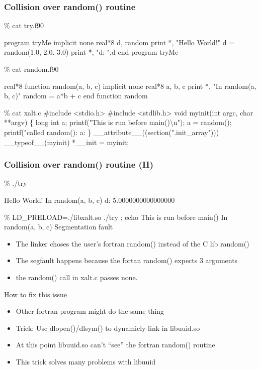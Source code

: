 \documentclass{beamer}
\begin{document}
\begin{frame}[fragile]
    \frametitle{Collision over random() routine}
 {\tiny
    \begin{semiverbatim}
\% cat try.f90

program tryMe
   implicit none 
   real*8 d, random
   print *, "Hello World!"
   d = {\color{blue}{}random(1.0, 2.0. 3.0)}
   print *, "d: ",d
end program tryMe

\% cat random.f90

real*8 function {\color{blue}{}random(a, b, c)}
   implicit none
   real*8 a, b, c
   print *, "In random(a, b, c)"
   random = a*b + c
end function random

\% cat xalt.c
#include <stdio.h>
#include <stdlib.h>
void myinit(int argc, char **argv)
\{
  long int a;
  printf("This is run before main()\textbackslash{}n");
  a = {\color{red}{}random()};
  printf("called random(): a: %
\}
__attribute__((section(".init_array"))) __typeof__(myinit) *__init = myinit;

\end{semiverbatim}
}
\end{frame}

\begin{frame}[fragile]
    \frametitle{Collision over random() routine (II)}
 {\tiny
    \begin{semiverbatim}
\% ./try

 Hello World!
 In random(a, b, c)
 d:    5.0000000000000000     

\% LD_PRELOAD=./libxalt.so  ./try  ; echo
This is run before main()
 In random(a, b, c)
Segmentation fault
    \end{semiverbatim}
}
  \begin{itemize}
    \item The linker choses the user's fortran random() instead of the C lib
      random()
    \item The segfault happens because the fortan random() expects 3
      arguments
    \item the random() call in xalt.c passes none.
  \end{itemize}

\end{frame}

\begin{frame}{How to fix this issue}
  \begin{itemize}
    \item Other fortran program might do the same thing
    \item Trick: Use dlopen()/dlsym() to dynamicly link in libuuid.so
    \item At this point libuuid.so can't ``see'' the fortran random()
      routine
    \item This trick solves many problems with libuuid
  \end{itemize}
\end{frame}
\end{document}
